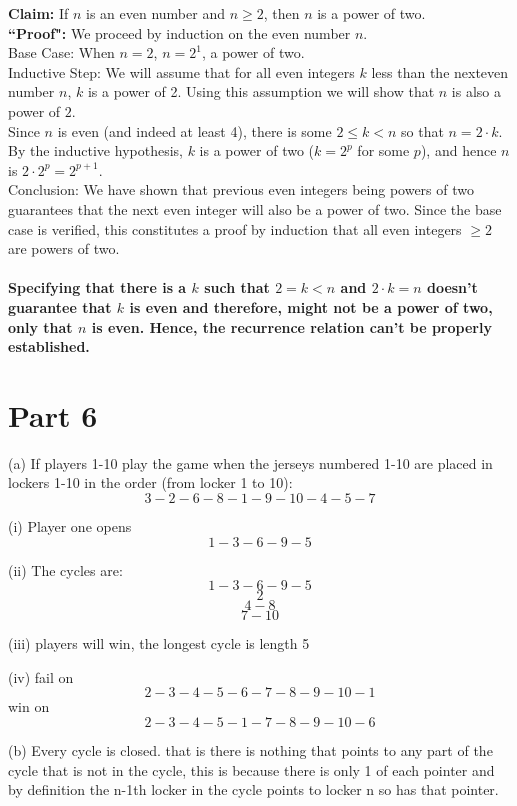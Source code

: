 \documentclass{article}
\begin{document}
{\bf Claim:} If $n$ is an even number and $n\ge 2$, then $n$ is a power of two.\\

{\bf ``Proof":} We proceed by induction on the even number $n$. \\

Base Case: When $n=2$, $n=2^1$, a power of two.\\

Inductive Step: We will assume that for all even integers $k$ less than the nexteven number $n$, $k$ is a power of 2.  Using this assumption we will show that $n$ is also a power of $2$.\\

Since $n$ is even (and indeed at least 4), there is some $2\le k<n$ so that $n=2\cdot k$.  By the inductive hypothesis, $k$ is a power of two ($k=2^p$ for some $p$), and hence $n$ is $2\cdot 2^p=2^{p+1}$.  \\

Conclusion: We have shown that previous even integers being powers of two guarantees that the next even integer will also be a power of two.  Since the base case is verified, this constitutes a proof by induction that all even integers $\ge 2$ are powers of two.\\

\paragraph{Specifying that there is a $k$ such that $2=k<n$ and $2·k=n$ doesn’t guarantee that $k$ is even and therefore, might not be a power of two, only that $n$ is even. Hence, the recurrence relation can’t be properly established.}
\newpage
\section{Part 6}
(a)  If players 1-10 play the game when the jerseys numbered 1-10 are placed in lockers 1-10 in the order (from locker 1 to 10):
$$3-2-6-8-1-9-10-4-5-7$$

(i) Player one opens 
$$1-3-6-9-5$$

(ii) The cycles are:
$$1-3-6-9-5$$
$$2$$
$$4-8$$
$$7-10$$

(iii) players will win, the longest cycle is length 5

(iv) fail on
$$2-3-4-5-6-7-8-9-10-1$$
win on
$$2-3-4-5-1-7-8-9-10-6$$


(b) Every cycle is closed. that is there is nothing that points to any part of the cycle that is not in the cycle, this is because there is only 1 of each pointer and by  definition the n-1th locker in the cycle points to locker n so has that pointer.
\end{document}
